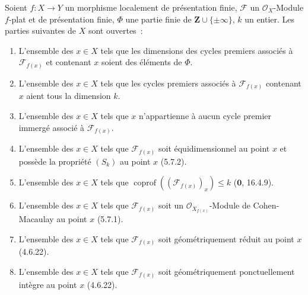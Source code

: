 \begin{theorem}[12.1.1]
\label{IV.12.1.1-fr}
Soient $f:X\to Y$ un morphisme localement de présentation finie, $\mathcal F$
un $\mathcal O_X$-Module $f$-plat et de présentation finie, $\Phi$ une partie
finie de $\mathbf Z\cup\{\pm\infty\}$, $k$ un entier. Les parties suivantes de
$X$ sont ouvertes~:
\begin{enumerate}[label=(\roman*)]
  \item L'ensemble des $x\in X$ tels que les dimensions des cycles premiers
  associés à $\mathcal F_{f(x)}$ et contenant $x$ soient des éléments de
  $\Phi$.
  \item L'ensemble des $x\in X$ tels que les cycles premiers associés à
  $\mathcal F_{f(x)}$ contenant $x$ aient tous la dimension $k$.
  \item L'ensemble des $x\in X$ tels que $x$ n'appartienne à aucun cycle
  premier immergé associé à $\mathcal F_{f(x)}$.
  \item L'ensemble des $x\in X$ tels que $\mathcal F_{f(x)}$ soit
  équidimensionnel au point $x$ et possède la propriété $(S_k)$ au point $x$
  (5.7.2).
  \item L'ensemble des $x\in X$ tels que
  $\operatorname{coprof}((\mathcal F_{f(x)})_x)\leq k$
  ($\mathbf 0$, 16.4.9).
  \item L'ensemble des $x\in X$ tels que $\mathcal F_{f(x)}$ soit un
  $\mathcal O_{X_{f(x)}}$-Module de Cohen-Macaulay au point $x$ (5.7.1).
  \item L'ensemble des $x\in X$ tels que $\mathcal F_{f(x)}$ soit
  géométriquement réduit au point $x$ (4.6.22).
  \item L'ensemble des $x\in X$ tels que $\mathcal F_{f(x)}$ soit
  géométriquement ponctuellement intègre au point $x$ (4.6.22).
\end{enumerate}
\end{theorem}

